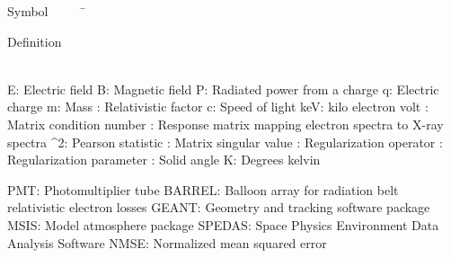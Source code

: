 

\begin{tabbing}
Symbol~~~~~\= \ \ \ \ \ \ \ \ \ \ \ \ \ \ \ \ \ \ \ \ \ \ \ \ \ \ \ \ \ \ \ \ \ \ \ \  \parbox{5in}{Definition}\\

\addsymbol E: {Electric field}
\addsymbol B: {Magnetic field}
\addsymbol P: {Radiated power from a charge}
\addsymbol q: {Electric charge}
\addsymbol m: {Mass}
\addsymbol \beta: {Relativistic factor}
\addsymbol c: {Speed of light}
\addsymbol \mbox{keV}: {kilo electron volt}
\addsymbol \kappa: {Matrix condition number}
\addsymbol {}: {Response matrix mapping electron spectra to X-ray spectra}
\addsymbol \chi^2: {Pearson statistic}
\addsymbol \sigma: {Matrix singular value}
\addsymbol {}: {Regularization operator}
\addsymbol \alpha: {Regularization parameter}
\addsymbol \Omega: {Solid angle}
\addsymbol K: {Degrees kelvin}

\addsymbol \mbox{PMT}: {Photomultiplier tube}
\addsymbol \mbox{BARREL}: {Balloon array for radiation belt relativistic electron losses}
\addsymbol \mbox{GEANT}: {Geometry and tracking software package}
\addsymbol \mbox{MSIS}: {Model atmosphere package}
\addsymbol \mbox{SPEDAS}: {Space Physics Environment Data Analysis Software}
\addsymbol \mbox{NMSE}: {Normalized mean squared error}

\end{tabbing}
